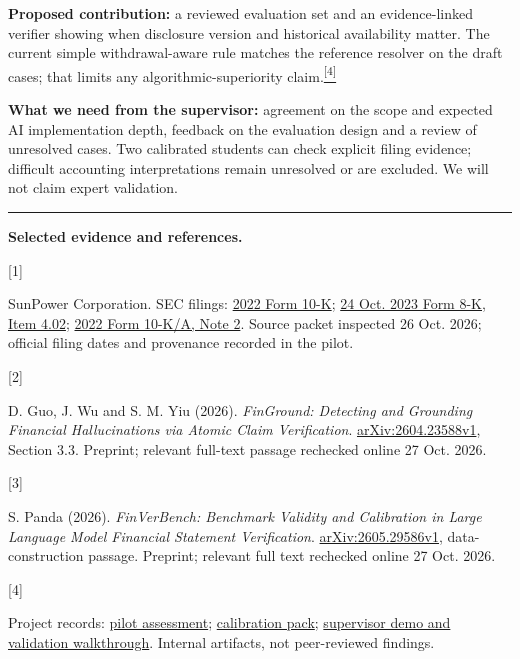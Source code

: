 \documentclass[10pt,a4paper]{article}
\newcommand{\citebrief}[1]{\hyperlink{ref#1}{\textsuperscript{[#1]}}}
\begin{document}
\textbf{Proposed contribution:} a reviewed evaluation set and an evidence-linked verifier showing when disclosure version and historical availability matter. The current simple withdrawal-aware rule matches the reference resolver on the draft cases; that limits any algorithmic-superiority claim.\citebrief{4}

\textbf{What we need from the supervisor:} agreement on the scope and expected AI implementation depth, feedback on the evaluation design and a review of unresolved cases. Two calibrated students can check explicit filing evidence; difficult accounting interpretations remain unresolved or are excluded. We will not claim expert validation.

\vspace{4pt}\hrule\vspace{3pt}
{\fontsize{7.6}{9.2}\selectfont
\textbf{Selected evidence and references.}\par
\hypertarget{ref1}{[1]} SunPower Corporation. SEC filings: \href{https://www.sec.gov/Archives/edgar/data/867773/000086777323000026/spwr-20230101.htm}{2022 Form 10-K}; \href{https://www.sec.gov/Archives/edgar/data/867773/000086777323000089/spwr-20231018.htm}{24 Oct. 2023 Form 8-K, Item 4.02}; \href{https://www.sec.gov/Archives/edgar/data/867773/000086777323000117/spwr-20230101.htm}{2022 Form 10-K/A, Note 2}. Source packet inspected 26 Oct. 2026; official filing dates and provenance recorded in the pilot.\par
\hypertarget{ref2}{[2]} D. Guo, J. Wu and S. M. Yiu (2026). \emph{FinGround: Detecting and Grounding Financial Hallucinations via Atomic Claim Verification}. \href{https://arxiv.org/html/2604.23588v1}{arXiv:2604.23588v1}, Section 3.3. Preprint; relevant full-text passage rechecked online 27 Oct. 2026.\par
\hypertarget{ref3}{[3]} S. Panda (2026). \emph{FinVerBench: Benchmark Validity and Calibration in Large Language Model Financial Statement Verification}. \href{https://arxiv.org/html/2605.29586v1}{arXiv:2605.29586v1}, data-construction passage. Preprint; relevant full text rechecked online 27 Oct. 2026.\par
\hypertarget{ref4}{[4]} Project records: \href{https://github.com/Shreya732-debug/Research-Work/blob/main/pilot/pilot_assessment.md}{pilot assessment}; \href{https://github.com/Shreya732-debug/Research-Work/tree/main/pilot/calibration}{calibration pack}; \href{https://github.com/Shreya732-debug/Research-Work/tree/codex/supervisor-demo-package/supervisor_demo}{supervisor demo and validation walkthrough}. Internal artifacts, not peer-reviewed findings.
}
\end{document}
